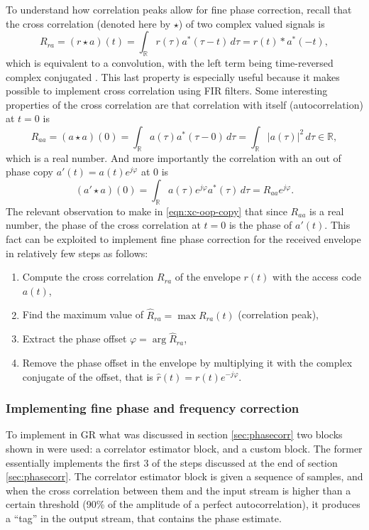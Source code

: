 To understand how correlation peaks allow for fine phase correction, recall that the cross correlation (denoted here by \(\star\)) of two complex valued signals is
\begin{equation}
	R_{ra}
	= (r \star a)(t)
	= \int_\mathbb{R} r(\tau) a^*(\tau - t) \,d\tau
	= r(t) * a^*(-t),
\end{equation}
which is equivalent to a convolution, with the left term being time-reversed complex conjugated \cite{Gallager}. This last property is especially useful because it makes possible to implement cross correlation using FIR filters. Some interesting properties of the cross correlation are that correlation with itself (autocorrelation) at \(t = 0\) is
\begin{equation}
	R_{aa} = (a \star a)(0)
	= \int_\mathbb{R} a(\tau) a^*(\tau - 0) \,d\tau
	= \int_\mathbb{R} |a(\tau)|^2 \,d\tau \in \mathbb{R},
\end{equation}
which is a real number. And more importantly the correlation with an out of phase copy \(a'(t) = a(t) e^{j\varphi}\) at 0 is
\begin{equation} \label{eqn:xc-oop-copy}
	(a' \star a)(0) 
	= \int_\mathbb{R} a(\tau)e^{j\varphi}  a^*(\tau) \,d\tau
	= R_{aa} e^{j\varphi}.
\end{equation}
The relevant observation to make in \eqref{eqn:xc-oop-copy} that since \(R_{aa}\) is a real number, the phase of the cross correlation at \(t = 0\) is the phase of \(a'(t)\). This fact can be exploited to implement fine phase correction for the received envelope in relatively few steps as follows:
\begin{enumerate}
	\item Compute the cross correlation \(R_{ra}\) of the envelope \(r(t)\) with the access code \(a(t)\),
	\item Find the maximum value of \(\hat{R}_{ra} = \max R_{ra}(t)\) (correlation peak),
	\item Extract the phase offset \(\varphi = \arg \hat{R}_{ra}\),
	\item Remove the phase offset in the envelope by multiplying it with the complex conjugate of the offset, that is \(\hat{r}(t) = r(t) e^{-j\varphi}\).
\end{enumerate}

\subsubsection{Implementing fine phase and frequency correction} \label{sec:implement-phasecorr}
To implement in GR what was discussed in section \ref{sec:phasecorr} two blocks shown in  were used: a correlator estimator block, and a custom block. The former essentially implements the first 3 of the steps discussed at the end of section \ref{sec:phasecorr}. The correlator estimator block is given a sequence of samples, and when the cross correlation between them and the input stream is higher than a certain threshold (90\% of the amplitude of a perfect autocorrelation), it produces a ``tag'' in the output stream, that contains the phase estimate.

